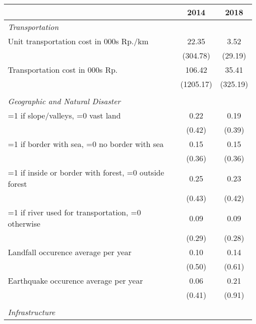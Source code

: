 \begin{tabular}{l*{2}{c}}
\hline\hline
                    &        2014&        2018\\
\hline
\emph{Transportation}&            &            \\
\hspace{0.25cm} Unit transportation cost in 000s Rp./km&       22.35&        3.52\\
                    &    (304.78)&     (29.19)\\
\hspace{0.25cm} Transportation cost in 000s Rp.&      106.42&       35.41\\
                    &   (1205.17)&    (325.19)\\
\vspace{0.1em} \\ \emph{Geographic and Natural Disaster}&            &            \\
\hspace{0.25cm} =1 if slope/valleys, =0 vast land&        0.22&        0.19\\
                    &      (0.42)&      (0.39)\\
\hspace{0.25cm} =1 if border with sea, =0 no border with sea&        0.15&        0.15\\
                    &      (0.36)&      (0.36)\\
\hspace{0.25cm} =1 if inside or border with forest, =0 outside forest&        0.25&        0.23\\
                    &      (0.43)&      (0.42)\\
\hspace{0.25cm} =1 if river used for transportation, =0 otherwise&        0.09&        0.09\\
                    &      (0.29)&      (0.28)\\
\hspace{0.25cm} Landfall occurence average per year&        0.10&        0.14\\
                    &      (0.50)&      (0.61)\\
\hspace{0.25cm} Earthquake occurence average per year&        0.06&        0.21\\
                    &      (0.41)&      (0.91)\\
\vspace{0.1em} \\ \emph{Infrastructure}&            &            \\

\end{tabular}
